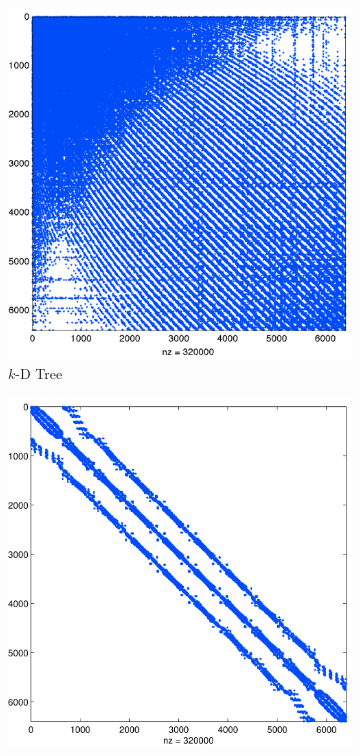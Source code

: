 \documentclass{report}
\begin{document}
\begin{figure}
\centering
\begin{subfigure}{0.425\textwidth}
\includegraphics[width=1.0\textwidth]{../figures/chapter2/hashing_example/bruteforce_N6400_n50-eps-converted-to.png}
\caption{$k$-D Tree} 
\end{subfigure} 
\begin{subfigure}{0.425\textwidth}
\includegraphics[width=1.0\textwidth]{../figures/chapter2/hashing_example/lsh_N6400_n50-eps-converted-to.png}

\end{subfigure}
\end{figure}
\end{document}
